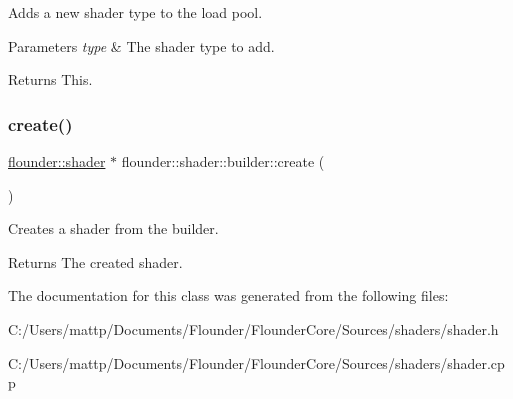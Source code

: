 Adds a new shader type to the load pool. 


\begin{DoxyParams}{Parameters}
{\em type} & The shader type to add. \\
\hline
\end{DoxyParams}
\begin{DoxyReturn}{Returns}
This. 
\end{DoxyReturn}
\mbox{\label{classflounder_1_1shader_1_1builder_a99923013d39273486149c8fd54f6f9a9}} 
\subsubsection{\texorpdfstring{create()}{create()}}
{\footnotesize\ttfamily \hyperlink{classflounder_1_1shader}{flounder\+::shader} $\ast$ flounder\+::shader\+::builder\+::create (\begin{DoxyParamCaption}{ }\end{DoxyParamCaption})}



Creates a shader from the builder. 

\begin{DoxyReturn}{Returns}
The created shader. 
\end{DoxyReturn}


The documentation for this class was generated from the following files\+:\begin{DoxyCompactItemize}
\item 
C\+:/\+Users/mattp/\+Documents/\+Flounder/\+Flounder\+Core/\+Sources/shaders/shader.\+h\item 
C\+:/\+Users/mattp/\+Documents/\+Flounder/\+Flounder\+Core/\+Sources/shaders/shader.\+cpp\end{DoxyCompactItemize}
